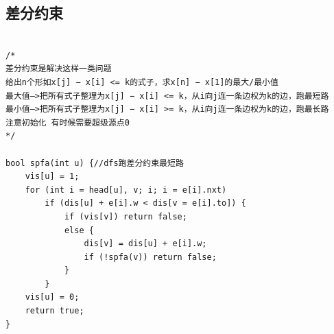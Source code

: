 \documentclass[twoside]{article}
\begin{document}
\subsection{差分约束}
\begin{lstlisting}
  
/*
差分约束是解决这样一类问题
给出n个形如x[j] − x[i] <= k的式子，求x[n] − x[1]的最大/最小值
最大值—>把所有式子整理为x[j] − x[i] <= k，从i向j连一条边权为k的边，跑最短路
最小值—>把所有式子整理为x[j] − x[i] >= k，从i向j连一条边权为k的边，跑最长路
注意初始化 有时候需要超级源点0
*/

bool spfa(int u) {//dfs跑差分约束最短路
    vis[u] = 1;
    for (int i = head[u], v; i; i = e[i].nxt)
        if (dis[u] + e[i].w < dis[v = e[i].to]) {
            if (vis[v]) return false;
            else {
                dis[v] = dis[u] + e[i].w;
                if (!spfa(v)) return false;
            }
        }
    vis[u] = 0;
    return true;
}\end{lstlisting}
\end{document}
